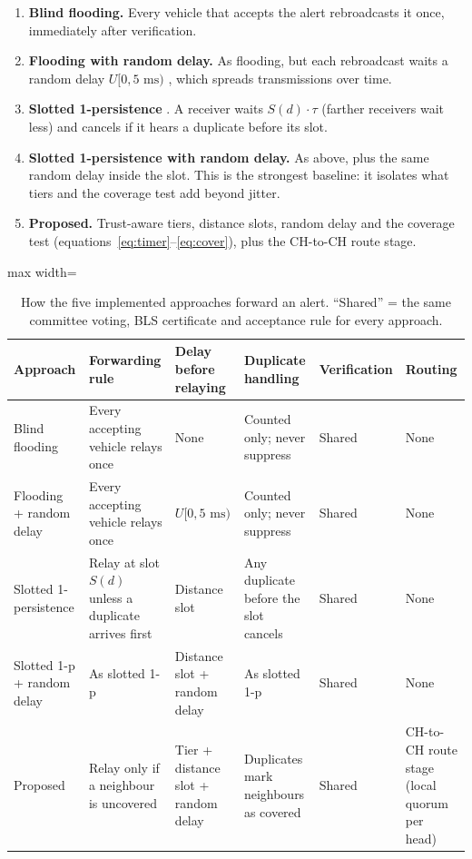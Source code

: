 \documentclass[11pt, a4paper]{article}
\begin{document}
\begin{enumerate}[noitemsep, topsep=2pt]
  \item \textbf{Blind flooding.} Every vehicle that accepts the alert rebroadcasts it once, immediately after verification.
  \item \textbf{Flooding with random delay.} As flooding, but each rebroadcast waits a random delay $U[0, 5\text{ ms})$
        \cite{ni1999broadcast}, which spreads transmissions over time.
  \item \textbf{Slotted 1-persistence} \cite{wisitpongphan2007}. A receiver waits $S(d)\cdot\tau$ (farther receivers wait
        less) and cancels if it hears a duplicate before its slot.
  \item \textbf{Slotted 1-persistence with random delay.} As above, plus the same random delay inside the slot. This is
        the strongest baseline: it isolates what tiers and the coverage test add beyond jitter.
  \item \textbf{Proposed.} Trust-aware tiers, distance slots, random delay and the coverage test
        (equations~\ref{eq:timer}--\ref{eq:cover}), plus the CH-to-CH route stage.
\end{enumerate}

\begin{table}[htbp]
\centering
\footnotesize
\renewcommand{\arraystretch}{1.2}
\begin{adjustbox}{max width=\textwidth}
\begin{tabular}{|>{\raggedright\arraybackslash}p{2.6cm}|>{\raggedright\arraybackslash}p{3.1cm}|>{\raggedright\arraybackslash}p{2.5cm}|>{\raggedright\arraybackslash}p{3.0cm}|>{\raggedright\arraybackslash}p{2.0cm}|>{\raggedright\arraybackslash}p{2.2cm}|}
\hline
\textbf{Approach} & \textbf{Forwarding rule} & \textbf{Delay before relaying} & \textbf{Duplicate handling} & \textbf{Verification} & \textbf{Routing} \\
\hline
Blind flooding & Every accepting vehicle relays once & None & Counted only; never suppress & Shared & None \\
\hline
Flooding + random delay & Every accepting vehicle relays once & $U[0, 5\text{ ms})$ & Counted only; never suppress & Shared & None \\
\hline
Slotted 1-persistence & Relay at slot $S(d)$ unless a duplicate arrives first & Distance slot & Any duplicate before the slot cancels & Shared & None \\
\hline
Slotted 1-p + random delay & As slotted 1-p & Distance slot + random delay & As slotted 1-p & Shared & None \\
\hline
Proposed & Relay only if a neighbour is uncovered & Tier + distance slot + random delay & Duplicates mark neighbours as covered & Shared & CH-to-CH route stage (local quorum per head) \\
\hline
\end{tabular}
\end{adjustbox}
\caption{How the five implemented approaches forward an alert. ``Shared'' = the same committee voting, BLS certificate
and acceptance rule for every approach.}
\label{tab:mech}
\end{table}
\end{document}
